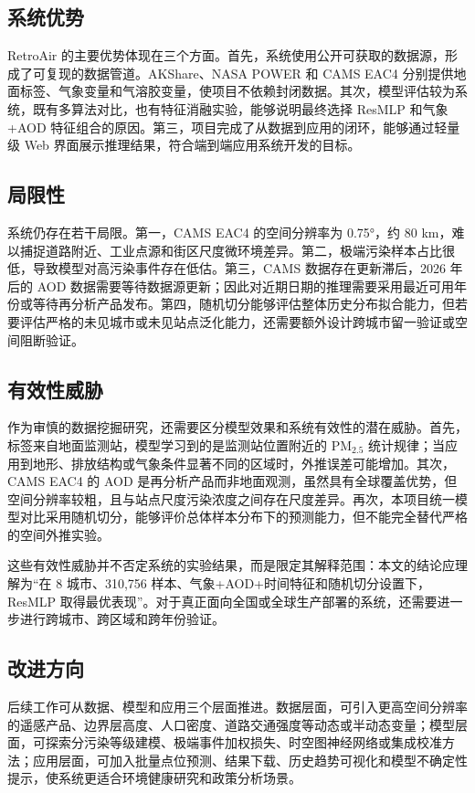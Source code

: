 \documentclass[UTF8,zihao=-4,a4paper]{ctexart}
\newcommand{\pmfine}{PM$_{2.5}$}
\newcommand{\aod}{AOD}
\begin{document}
\subsection{系统优势}

RetroAir 的主要优势体现在三个方面。首先，系统使用公开可获取的数据源，形成了可复现的数据管道。AKShare、NASA POWER 和 CAMS EAC4 分别提供地面标签、气象变量和气溶胶变量，使项目不依赖封闭数据。其次，模型评估较为系统，既有多算法对比，也有特征消融实验，能够说明最终选择 ResMLP 和气象+\aod{} 特征组合的原因。第三，项目完成了从数据到应用的闭环，能够通过轻量级 Web 界面展示推理结果，符合端到端应用系统开发的目标。

\subsection{局限性}

系统仍存在若干局限。第一，CAMS EAC4 的空间分辨率为 0.75°，约 80 km，难以捕捉道路附近、工业点源和街区尺度微环境差异。第二，极端污染样本占比很低，导致模型对高污染事件存在低估。第三，CAMS 数据存在更新滞后，2026 年后的 \aod{} 数据需要等待数据源更新；因此对近期日期的推理需要采用最近可用年份或等待再分析产品发布。第四，随机切分能够评估整体历史分布拟合能力，但若要评估严格的未见城市或未见站点泛化能力，还需要额外设计跨城市留一验证或空间阻断验证。

\subsection{有效性威胁}

作为审慎的数据挖掘研究，还需要区分模型效果和系统有效性的潜在威胁。首先，标签来自地面监测站，模型学习到的是监测站位置附近的 \pmfine{} 统计规律；当应用到地形、排放结构或气象条件显著不同的区域时，外推误差可能增加。其次，CAMS EAC4 的 \aod{} 是再分析产品而非地面观测，虽然具有全球覆盖优势，但空间分辨率较粗，且与站点尺度污染浓度之间存在尺度差异。再次，本项目统一模型对比采用随机切分，能够评价总体样本分布下的预测能力，但不能完全替代严格的空间外推实验。

这些有效性威胁并不否定系统的实验结果，而是限定其解释范围：本文的结论应理解为“在 8 城市、310,756 样本、气象+\aod{}+时间特征和随机切分设置下，ResMLP 取得最优表现”。对于真正面向全国或全球生产部署的系统，还需要进一步进行跨城市、跨区域和跨年份验证。

\subsection{改进方向}

后续工作可从数据、模型和应用三个层面推进。数据层面，可引入更高空间分辨率的遥感产品、边界层高度、人口密度、道路交通强度等动态或半动态变量；模型层面，可探索分污染等级建模、极端事件加权损失、时空图神经网络或集成校准方法；应用层面，可加入批量点位预测、结果下载、历史趋势可视化和模型不确定性提示，使系统更适合环境健康研究和政策分析场景。
\end{document}
